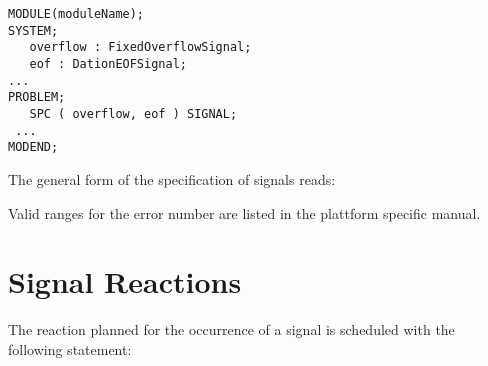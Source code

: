 \begin{lstlisting}
MODULE(moduleName);
SYSTEM;
   overflow : FixedOverflowSignal;
   eof : DationEOFSignal;
...
PROBLEM;
   SPC ( overflow, eof ) SIGNAL;
 ... 
MODEND;
\end{lstlisting}

The general form of the specification of signals reads:

\begin{grammarframe}

\end{grammarframe}


%
%

Valid ranges for the error number are listed in the plattform specific manual.


\section{Signal Reactions}
\label{sec_signal_reactions}
The reaction planned for the occurrence of a signal is scheduled with
the following statement:


